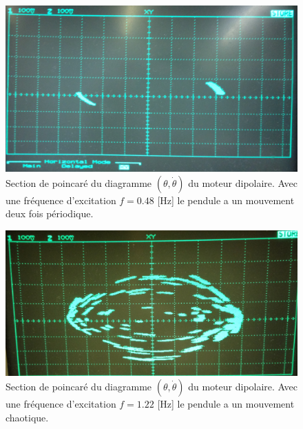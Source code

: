 \documentclass[a4paper,12pt,oneside]{article}
\begin{document}
\begin{figure}[h!]
  \begin{center}
  \includegraphics[width=1.0\linewidth,angle=0]{./figures/2T_0_48Hz.png}
  \caption{Section de poincaré du diagramme $(\theta,\dot{\theta})$ du moteur dipolaire. Avec une fréquence d'excitation $f=0.48$ [Hz] le pendule a un mouvement deux fois périodique.} \label{fig:dipol2T}
  \end{center}
\end{figure}

\begin{figure}[h!]
  \begin{center}
  \includegraphics[width=1.0\linewidth,angle=0]{./figures/chao_1_22Hz_v2.png}
  \caption{Section de poincaré du diagramme $(\theta,\dot{\theta})$ du moteur dipolaire. Avec une fréquence d'excitation $f=1.22$ [Hz] le pendule a un mouvement chaotique.} \label{fig:chaos}
  \end{center}
\end{figure}
\end{document}
